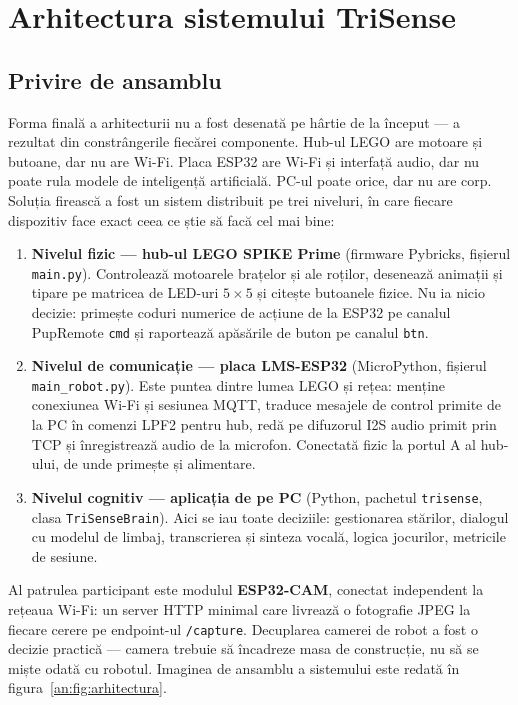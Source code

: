 \chapter{Arhitectura sistemului TriSense}
\label{an:cap:arhitectura}

\section{Privire de ansamblu}

Forma finală a arhitecturii nu a fost desenată pe hârtie de la început — a rezultat din constrângerile fiecărei componente. Hub-ul LEGO are motoare și butoane, dar nu are Wi-Fi. Placa ESP32 are Wi-Fi și interfață audio, dar nu poate rula modele de inteligență artificială. PC-ul poate orice, dar nu are corp. Soluția firească a fost un sistem distribuit pe trei niveluri, în care fiecare dispozitiv face exact ceea ce știe să facă cel mai bine:

\begin{enumerate}
    \item \textbf{Nivelul fizic — hub-ul LEGO SPIKE Prime} (firmware Pybricks, fișierul \texttt{main.py}). Controlează motoarele brațelor și ale roților, desenează animații și tipare pe matricea de LED-uri $5\times5$ și citește butoanele fizice. Nu ia nicio decizie: primește coduri numerice de acțiune de la ESP32 pe canalul PupRemote \texttt{cmd} și raportează apăsările de buton pe canalul \texttt{btn}.
    \item \textbf{Nivelul de comunicație — placa LMS-ESP32} (MicroPython, fișierul \texttt{main\_robot.py}). Este puntea dintre lumea LEGO și rețea: menține conexiunea Wi-Fi și sesiunea MQTT, traduce mesajele de control primite de la PC în comenzi LPF2 pentru hub, redă pe difuzorul I2S audio primit prin TCP și înregistrează audio de la microfon. Conectată fizic la portul A al hub-ului, de unde primește și alimentare.
    \item \textbf{Nivelul cognitiv — aplicația de pe PC} (Python, pachetul \texttt{trisense}, clasa \texttt{TriSenseBrain}). Aici se iau toate deciziile: gestionarea stărilor, dialogul cu modelul de limbaj, transcrierea și sinteza vocală, logica jocurilor, metricile de sesiune.
\end{enumerate}

Al patrulea participant este modulul \textbf{ESP32-CAM}, conectat independent la rețeaua Wi-Fi: un server HTTP minimal care livrează o fotografie JPEG la fiecare cerere pe endpoint-ul \texttt{/capture}. Decuplarea camerei de robot a fost o decizie practică — camera trebuie să încadreze masa de construcție, nu să se miște odată cu robotul. Imaginea de ansamblu a sistemului este redată în figura~\ref{an:fig:arhitectura}.

